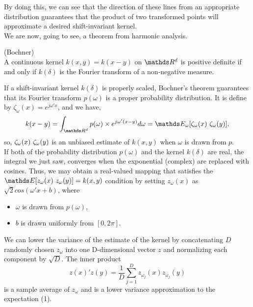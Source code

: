 \documentclass{article}
\begin{document}
By doing this, we can see that the direction of these lines from an appropriate distribution guarantees that the product of two transformed points will approximate a desired shift-invariant kernel.\\

We are now, going to see, a theorem from harmonic analysis.
\begin{theorem}(Bochner)\\
A continuous kernel $k(x,y) = k(x - y)$ on $\bbR^d$ is positive definite if and only if $k(\delta)$ is the Fourier transform of a non-negative measure.
\end{theorem}

If a shift-invariant kernel $k(\delta)$ is properly scaled, Bochner’s theorem guarantees that its Fourier transform $p(\omega)$ is a proper probability distribution. It is define by $\zeta_{\omega}(x) = e^{j\omega'x}$, and we have, 
\begin{equation}
        k(x-y) = \int_{\bbR^d} p(\omega) \times e^{j\omega'(x-y)}d\omega \\
        = \bbE_{\omega}[\zeta_{\omega}(x) \ \zeta_{\omega}(y)\*],
\end{equation}
so, $\zeta_{\omega}(x) \ \zeta_{\omega}(y)\*$ is an unbiased estimate of $k(x,y)$ when $\omega$ is drawn from $p$.\\
If both of the probability distribution $p(\omega)$ and the kernel $k(\delta)$ are real, the integral we just saw, converges when the exponential (complex) are replaced with cosines. Thus, we may obtain a real-valued mapping that satisfies the $\bbE[z_{\omega}(x)\ z_{\omega}(y)] = k(x,y)$ condition by setting $z_{\omega}(x)$ as $\sqrt{2} cos(\omega' x + b)$, where
\begin{itemize}
    \item $\omega$ is drawn from $p(\omega)$,
    \item $b$ is drawn uniformly from $[0, 2\pi]$.
\end{itemize}

We can lower the variance of the estimate of the kernel by concatenating $D$ randomly chosen $z_{\omega}$ into one D-dimensional vector $z$ and normalizing each component by $\sqrt{D}$. The inner product
\begin{equation*}
   z(x)' z(y) = \frac{1}{D} \sum_{j=1}^D z_{\omega_j}(x) z_{\omega_j}(y)  
\end{equation*}
is a sample average of $z_{\omega}$ and is a lower variance approximation to the expectation (1).\\
\end{document}
